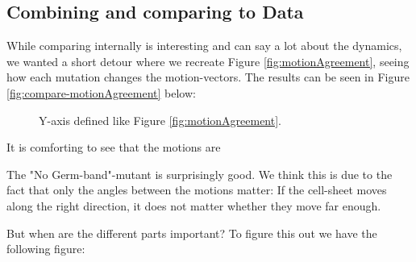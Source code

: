 \subsection{Combining and comparing to Data}
While comparing internally is interesting and can say a lot about the dynamics, we wanted a short detour where we recreate Figure \ref{fig:motionAgreement}, seeing how each mutation changes the motion-vectors. The results can be seen in Figure \ref{fig:compare-motionAgreement} below:

\begin{figure}[H]
    \centering
    \caption{ Y-axis defined like Figure \ref{fig:motionAgreement}. }
    \label{fig:compare-motionAgreement-time}
\end{figure}
It is comforting to see that the motions are 

The "No Germ-band"-mutant is surprisingly good. We think this is due to the fact that only the angles between the motions matter: If the cell-sheet moves along the right direction, it does not matter whether they move far enough.   

But when are the different parts important? To figure this out we have the following figure:

